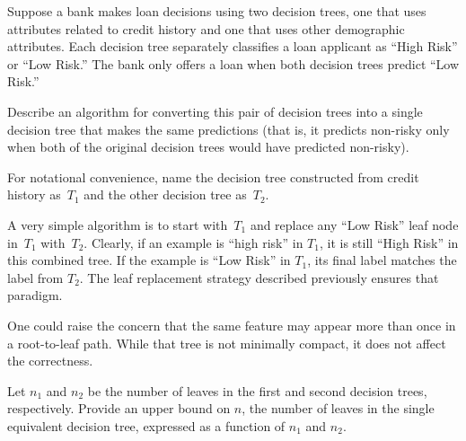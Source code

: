 \begin{problem}
  Suppose a bank makes loan decisions using two decision trees, one that uses attributes related to credit history and one that uses other demographic attributes. Each decision tree separately classifies a loan applicant as “High Risk” or “Low Risk.” The bank only offers a loan when both decision trees predict “Low Risk.”
\end{problem}

\begin{subproblem}
  Describe an algorithm for converting this pair of decision trees into a single decision tree that makes the same predictions (that is, it predicts non-risky only when both of the original decision trees would have predicted non-risky).
\end{subproblem}

For notational convenience, name the decision tree constructed from credit history as~$T_1$ and the other decision tree as~$T_2$.

A very simple algorithm is to start with~$T_1$ and replace any ``Low Risk'' leaf node in~$T_1$ with~$T_2$.  Clearly, if an example is ``high risk'' in $T_1$, it is still ``High Risk'' in this combined tree.  If the example is ``Low Risk'' in $T_1$, its final label matches the label from $T_2$.  The leaf replacement strategy described previously ensures that paradigm.

One could raise the concern that the same feature may appear more than once in a root-to-leaf path.  While that tree is not minimally compact, it does not affect the correctness.

\begin{subproblem}
  Let $n_1$ and $n_2$ be the number of leaves in the first and second decision trees, respectively. Provide an upper bound on $n$, the number of leaves in the single equivalent decision tree, expressed as a function of $n_1$ and $n_2$.
\end{subproblem}

